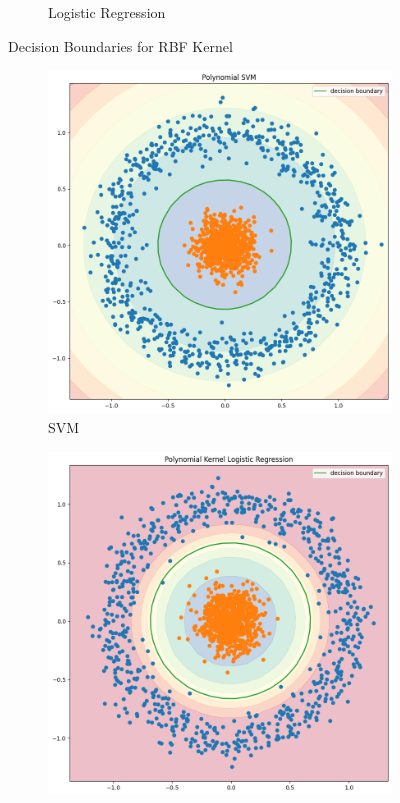 \documentclass[a4paper]{article}
\theoremstyle{definition}
\newenvironment{soln}{
    \leavevmode\color{blue}\ignorespaces
}{}
\begin{document}
\begin{itemize}
\begin{soln}
\begin{figure}[H]
\begin{subfigure}[b]{0.5\textwidth}
                \caption{Logistic Regression}
            \end{subfigure}
            \caption{Decision Boundaries for RBF Kernel}
        \end{figure}
        \begin{figure}[H]
            \centering
            \begin{subfigure}[b]{0.5\textwidth}
                \centering
                \includegraphics[scale=0.2]{Images/q2_2_2/SVM_Poly.png}
                \caption{SVM}
            \end{subfigure}%
            \begin{subfigure}[b]{0.5\textwidth}
                \centering
                \includegraphics[scale=0.2]{Images/q2_2_2/Log_Poly.png}

\end{subfigure}
\end{figure}
\end{soln}
\end{itemize}
\end{document}
